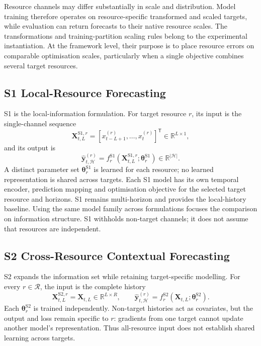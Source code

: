 \documentclass[a4paper,fleqn]{cas-dc}
\begin{document}
Resource channels may differ substantially in scale and distribution. Model
training therefore operates on resource-specific transformed and scaled
targets, while evaluation can return forecasts to their native resource
scales. The transformations and training-partition scaling rules belong to the
experimental instantiation. At the framework level, their purpose is to place
resource errors on comparable optimisation scales, particularly when a single
objective combines several target resources.

\subsection{S1 Local-Resource Forecasting}
\label{sec:s1}

S1 is the local-information formulation. For target resource $r$, its input is
the single-channel sequence
\begin{equation}
  \mathbf{X}_{t,L}^{\mathrm{S1},r}
  = [x_{t-L+1}^{(r)},\ldots,x_t^{(r)}]^{\mathsf T}
  \in\mathbb{R}^{L\times 1},
  \label{eq:s1-input}
\end{equation}
and its output is
\begin{equation}
  \widehat{\mathbf{y}}_{t,\mathcal{H}}^{(r)}
  = f_r^{\mathrm{S1}}
    (\mathbf{X}_{t,L}^{\mathrm{S1},r};\boldsymbol{\theta}_r^{\mathrm{S1}})
  \in\mathbb{R}^{|\mathcal{H}|}.
  \label{eq:s1-forecast}
\end{equation}
A distinct parameter set $\boldsymbol{\theta}_r^{\mathrm{S1}}$ is learned for
each resource; no learned representation is shared across targets. Each S1
model has its own temporal encoder, prediction mapping and optimisation
objective for the selected target resource and horizons. S1 remains
multi-horizon and provides the local-history baseline. Using the same model
family across formulations focuses the comparison on information structure.
S1 withholds non-target channels; it does not assume that resources are
independent.

\subsection{S2 Cross-Resource Contextual Forecasting}
\label{sec:s2}

S2 expands the information set while retaining target-specific modelling. For
every $r\in\mathcal{R}$, the input is the complete history
\begin{equation}
  \mathbf{X}_{t,L}^{\mathrm{S2},r}=\mathbf{X}_{t,L}
  \in\mathbb{R}^{L\times R},
  \qquad
  \widehat{\mathbf{y}}_{t,\mathcal{H}}^{(r)}
  = f_r^{\mathrm{S2}}
    (\mathbf{X}_{t,L};\boldsymbol{\theta}_r^{\mathrm{S2}}).
  \label{eq:s2-forecast}
\end{equation}
Each $\boldsymbol{\theta}_r^{\mathrm{S2}}$ is trained independently.
Non-target histories act as covariates, but the output and loss remain
specific to $r$: gradients from one target cannot update another model's
representation. Thus all-resource input does not establish shared learning
across targets.
\end{document}
